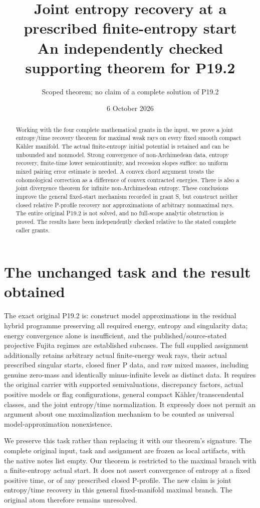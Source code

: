 \documentclass[11pt]{article}
\title{Joint entropy recovery at a prescribed finite-entropy start\\
\large An independently checked supporting theorem for P19.2}
\author{Scoped theorem; no claim of a complete solution of P19.2}
\date{6 October 2026}
\begin{document}
\maketitle
\begin{abstract}
Working with the four complete mathematical grants in the input, we
prove a joint entropy/time recovery theorem for maximal weak rays on
every fixed smooth compact K\"ahler manifold. The actual finite-entropy
initial potential is retained and can be unbounded and nonmodel.
Strong convergence of non-Archimedean data, entropy recovery, finite-time
lower semicontinuity, and recession slopes suffice: no uniform mixed
pairing error estimate is needed. A convex chord argument treats the
cohomological correction as a difference of convex contracted energies.
There is also a joint divergence theorem for infinite non-Archimedean
entropy. These conclusions improve the general fixed-start mechanism
recorded in grant S, but construct neither closed relative P-profile
recovery nor approximations of arbitrary nonmaximal rays. The entire
original P19.2 is not solved, and no full-scope analytic obstruction
is proved. The results have been independently checked relative to
the stated complete caller grants.
\end{abstract}

\section{The unchanged task and the result obtained}
The exact original P19.2 is: construct model approximations in the
residual hybrid programme preserving all required energy, entropy and
singularity data; energy convergence alone is insufficient, and the
published/source-stated projective Fujita regimes are established
subcases. The full supplied assignment additionally retains arbitrary
actual finite-energy weak rays, their actual prescribed singular starts,
closed finer P data, and raw mixed masses, including genuine zero-mass
and identically minus-infinite levels as distinct data. It requires
the original carrier with supported semivaluations, discrepancy factors,
actual positive models or flag configurations, general compact
K\"ahler/transcendental classes, and the joint entropy/time normalization.
It expressly does not permit an argument about one maximalization
mechanism to be counted as universal model-approximation nonexistence.

We preserve this task rather than replacing it with our theorem's
signature. The complete original input, task and assignment are frozen
as local artifacts, with the native notes list empty. Our theorem is
restricted to the maximal branch with a finite-entropy actual start.
It does not assert convergence of entropy at a fixed positive time,
or of any prescribed closed P-profile. The new claim is joint
entropy/time recovery in this general fixed-manifold maximal branch.
The original atom therefore remains unresolved.
\end{document}
